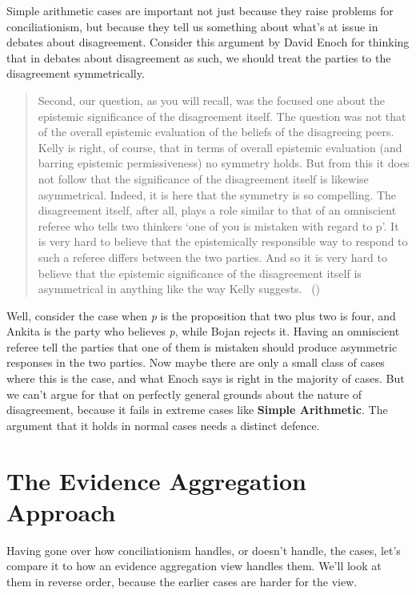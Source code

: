 \documentclass[
  10pt,
  letterpaper,
  twoside]{scrbook}
\begin{document}
Simple arithmetic cases are important not just because they raise
problems for conciliationism, but because they tell us something about
what's at issue in debates about disagreement. Consider this argument by
David Enoch for thinking that in debates about disagreement as such, we
should treat the parties to the disagreement symmetrically.

\begin{quote}
Second, our question, as you will recall, was the focused one about the
epistemic significance of the disagreement itself. The question was not
that of the overall epistemic evaluation of the beliefs of the
disagreeing peers. Kelly is right, of course, that in terms of overall
epistemic evaluation (and barring epistemic permissiveness) no symmetry
holds. But from this it does not follow that the significance of the
disagreement itself is likewise asymmetrical. Indeed, it is here that
the symmetry is so compelling. The disagreement itself, after all, plays
a role similar to that of an omniscient referee who tells two thinkers
`one of you is mistaken with regard to p'. It is very hard to believe
that the epistemically responsible way to respond to such a referee
differs between the two parties. And so it is very hard to believe that
the epistemic significance of the disagreement itself is asymmetrical in
anything like the way Kelly suggests. ~()
\end{quote}

Well, consider the case when \emph{p} is the proposition that two plus
two is four, and {Ankita} is the party who believes \emph{p}, while
{Bojan} rejects it. Having an omniscient referee tell the parties that
one of them is mistaken should produce asymmetric responses in the two
parties. Now maybe there are only a small class of cases where this is
the case, and what Enoch says is right in the majority of cases. But we
can't argue for that on perfectly general grounds about the nature of
disagreement, because it fails in extreme cases like \textbf{Simple
Arithmetic}. The argument that it holds in normal cases needs a distinct
defence.

\section{The Evidence Aggregation
Approach}\label{theevidenceaggregationapproach}

Having gone over how conciliationism handles, or doesn't handle, the
cases, let's compare it to how an evidence aggregation view handles
them. We'll look at them in reverse order, because the earlier cases are
harder for the view.
\end{document}
